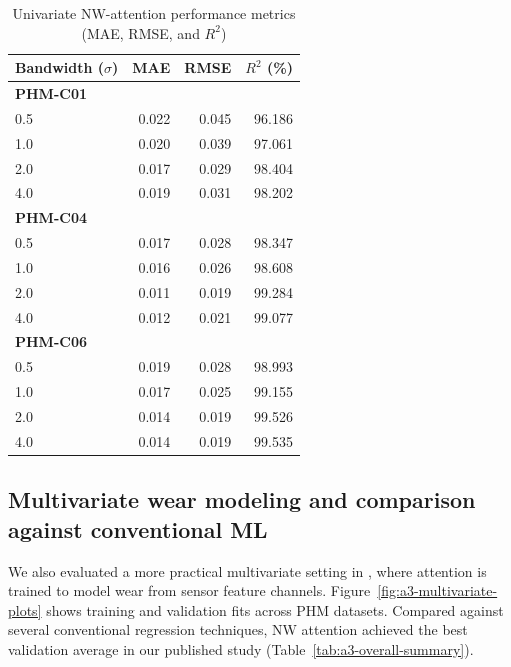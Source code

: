 \documentclass[12pt,oneside]{book}
\renewcommand{\arraystretch}{1.5}
\begin{document}
\begin{table}[htbp]
	\centering
	\caption{Univariate NW-attention performance metrics (MAE, RMSE, and $R^2$)}
	\label{tab:a3-univariate-metrics}
	{\renewcommand{\arraystretch}{1.1}
	\begin{tabular}{l r r r}
		\toprule
		\textbf{Bandwidth} ($\sigma$) & \textbf{MAE} & \textbf{RMSE} & \textbf{$R^2$ (\%)} \\
		\midrule
		\textbf{PHM-C01} \\
		0.5 & 0.022 & 0.045 & 96.186 \\
		1.0 & 0.020 & 0.039 & 97.061 \\
		2.0 & 0.017 & 0.029 & 98.404 \\
		4.0 & 0.019 & 0.031 & 98.202 \\
		\midrule
		\textbf{PHM-C04} \\
		0.5 & 0.017 & 0.028 & 98.347 \\
		1.0 & 0.016 & 0.026 & 98.608 \\
		2.0 & 0.011 & 0.019 & 99.284 \\
		4.0 & 0.012 & 0.021 & 99.077 \\
		\midrule
		\textbf{PHM-C06} \\
		0.5 & 0.019 & 0.028 & 98.993 \\
		1.0 & 0.017 & 0.025 & 99.155 \\
		2.0 & 0.014 & 0.019 & 99.526 \\
		4.0 & 0.014 & 0.019 & 99.535 \\
		\bottomrule
	\end{tabular}}
\end{table}

\subsection{Multivariate wear modeling and comparison against conventional ML}
We also evaluated a more practical multivariate setting in \cite{Siraskar2024NW}, where attention is trained to model wear from sensor feature channels. Figure~\ref{fig:a3-multivariate-plots} shows training and validation fits across PHM datasets. Compared against several conventional regression techniques, NW attention achieved the best validation average in our published study (Table~\ref{tab:a3-overall-summary}).
\end{document}
